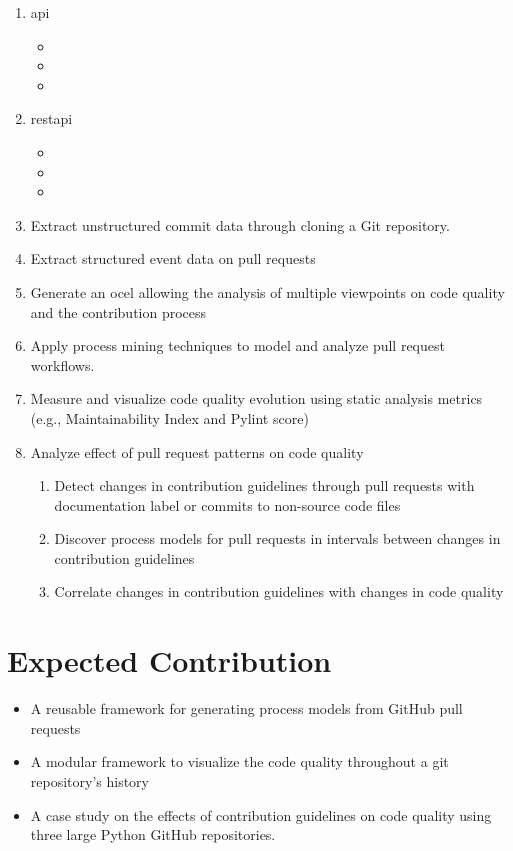 \begin{enumerate}[noitemsep]
	\item \ac{api}
	\begin{itemize}
		\item
		\item
		\item
	\end{itemize}
	\item \ac{restapi}
	\begin{itemize}
		\item
		\item
		\item 
	\end{itemize}
    \item Extract unstructured commit data through cloning a Git repository.
    \item Extract structured event data on pull requests
    \item Generate an \ac{ocel} allowing the analysis of multiple viewpoints on code quality and the contribution process
    \item Apply process mining techniques to model and analyze pull request workflows.
    \item Measure and visualize code quality evolution using static analysis metrics (e.g., Maintainability Index and Pylint score)
    \item Analyze effect of pull request patterns on code quality
    \begin{enumerate}
    		\item Detect changes in contribution guidelines through pull requests with documentation label or commits to non-source code files
    		\item Discover process models for pull requests in intervals between changes in contribution guidelines
    		\item Correlate changes in contribution guidelines with changes in code quality
    \end{enumerate}
\end{enumerate}

\section*{Expected Contribution}
\begin{itemize}[noitemsep]
    \item A reusable framework for generating process models from GitHub pull requests
    \item A modular framework to visualize the code quality throughout a git repository's history
    \item A case study on the effects of contribution guidelines on code quality using three large Python GitHub repositories.
\end{itemize}


